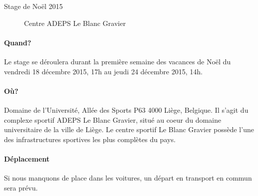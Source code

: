 \documentclass{article}
\begin{document}

\begin{center}\huge{Stage de Noël 2015}\end{center}

\vspace{1cm}

\begin{figure}
\caption*{Centre ADEPS Le Blanc Gravier}
\vspace{-1.8cm}
\end{figure}

\paragraph{Quand?} Le stage se déroulera durant la première semaine des vacances de Noël du vendredi 18 décembre 2015, 17h au jeudi 24 décembre 2015, 14h.

\paragraph{Où?} Domaine de l'Université, Allée des Sports P63 4000 Liège, Belgique. Il s'agit du complexe sportif ADEPS Le Blanc Gravier, situé au coeur du domaine universitaire de la ville de Liège. Le centre sportif Le Blanc Gravier possède l'une des infrastructures sportives les plus complètes du pays.

\paragraph{Déplacement} Si nous manquons de place dans les voitures, un départ en transport en commun sera prévu.
\end{document}
